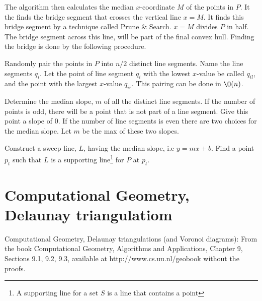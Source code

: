 \documentclass[10pt]{article}
\begin{document}
The algorithm then calculates the median $x$-coordinate $M$ of the points in $P$. It the finds the bridge segment that crosses the vertical line $x=M$. It finds this bridge segment by a technique called Prune & Search. $x=M$ divides $P$ in half. The bridge segment across this line, will be part of the final convex hull. Finding the bridge is done by the following procedure.

Randomly pair the points in $P$ into $n/2$ distinct line segments. Name the line segments $q_i$. Let the point of line segment $q_i$ with the lowest $x$-value be called $q_{il}$, and the point with the largest $x$-value $q_{ir}$. This pairing can be done in $\O(n)$.

Determine the median slope, $m$ of all the distinct line segments. If the number of points is odd, there will be a point that is not part of a line segment. Give this point a slope of $0$. If the number of line segments is even there are two choices for the median slope. Let $m$ be the max of these two slopes.

Construct a sweep line, $L$, having the median slope, i.e $y = mx+b$. Find a point $p_t$ such that $L$ is a supporting line\footnote{A supporting line for a set $S$ is a line that contains a point } for $P$ at $p_t$.






\section{Computational Geometry, Delaunay triangulatiom} %
\label{sec:computational_geometry_delaunay_triangulatiom}
Computational Geometry, Delaunay triangulations (and Voronoi diagrams): From the  book Computational Geometry, Algorithms and Applications, Chapter 9,  Sections 9.1, 9.2, 9.3, available at http://www.cs.uu.nl/geobook  without the proofs.                                                                  
\end{document}
